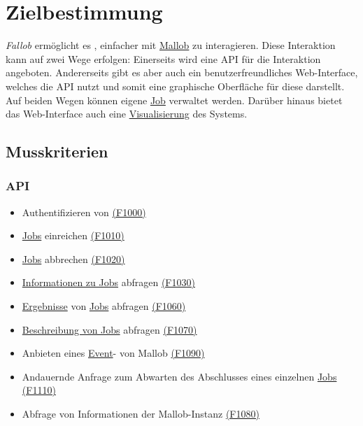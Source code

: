 \section{Zielbestimmung}
\textit{Fallob} ermöglicht es , einfacher mit \href{https://github.com/domschrei/Mallob}{Mallob} zu interagieren. Diese Interaktion kann auf zwei Wege erfolgen:
Einerseits wird eine \gls{API} für die Interaktion angeboten. Andererseits gibt es aber auch ein benutzerfreundliches \gls{Web-Interface}, welches die \gls{API} nutzt und somit eine graphische Oberfläche für diese darstellt. Auf beiden Wegen können eigene \hyperref[B:Jobs]{Job} verwaltet werden. Darüber hinaus bietet das \gls{Web-Interface} auch eine \hyperref[pages:visualization]{Visualisierung} des Systems.


\subsection{Musskriterien}
    \subsubsection{API}
        \begin{itemize}[noitemsep]
            \item Authentifizieren von  \hyperref[FA:API:Authentifizieren von Nutzern]{(F1000)}
            \item \hyperref[B:Jobs]{Jobs} einreichen \hyperref[FA:API:Einreichen von Jobs]{(F1010)}
            \item \hyperref[B:Jobs]{Jobs} abbrechen \hyperref[FA:API:Abbrechen von eingereichten Jobs]{(F1020)}
            \item \hyperref[B:Job-Informationen]{Informationen zu Jobs} abfragen \hyperref[FA:API:Abfragen der Informationenen von Jobs]{(F1030)}
            \item \hyperref[B:Job-Ergebnis]{Ergebnisse} von \hyperref[B:Jobs]{Jobs} abfragen \hyperref[FA:API:Ausgeben des Ergebnisses für eine oder mehrere Jobs]{(F1060)}
            \item \hyperref[B:Job-Beschreibung]{Beschreibung von Jobs} abfragen \hyperref[FA:API:Ausgeben der Job-Beschreibung]{(F1070)}
            \item Anbieten eines \hyperref[B:Event]{Event}- von \gls{Mallob} \hyperref[FA:API:Ausgeben eines Event-Streams von Mallob]{(F1090)}
            \item Andauernde Anfrage zum Abwarten des Abschlusses eines einzelnen \hyperref[B:Jobs]{Jobs} \hyperref[FA:API:Andauernde Abfrage des Ergebnisses eines Jobs]{(F1110)}
            \item Abfrage von Informationen der \gls{Mallob}-Instanz \hyperref[FA:API:Abfragen der Informationen von Mallob]{(F1080)}
        \end{itemize}
